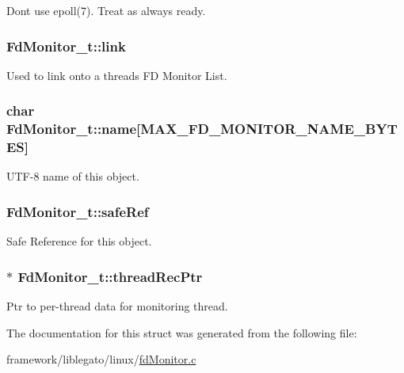 Don\textquotesingle{}t use epoll(7). Treat as always ready. 

\subsubsection[{\texorpdfstring{link}{link}}]{ Fd\+Monitor\+\_\+t\+::link}\hypertarget{struct_fd_monitor__t_aea39e3924b8381f24652d4ed432d5d1e}{}\label{struct_fd_monitor__t_aea39e3924b8381f24652d4ed432d5d1e}


Used to link onto a thread\textquotesingle{}s FD Monitor List. 

\subsubsection[{\texorpdfstring{name}{name}}]{\setlength{\rightskip}{0pt plus 5cm}char Fd\+Monitor\+\_\+t\+::name\mbox{[}{\bf M\+A\+X\+\_\+\+F\+D\+\_\+\+M\+O\+N\+I\+T\+O\+R\+\_\+\+N\+A\+M\+E\+\_\+\+B\+Y\+T\+ES}\mbox{]}}\hypertarget{struct_fd_monitor__t_a625d32b179f538af9be84b15f969f3aa}{}\label{struct_fd_monitor__t_a625d32b179f538af9be84b15f969f3aa}


U\+T\+F-\/8 name of this object. 

\subsubsection[{\texorpdfstring{safe\+Ref}{safeRef}}]{ Fd\+Monitor\+\_\+t\+::safe\+Ref}\hypertarget{struct_fd_monitor__t_aa12df9f2b06d5d406f127a01053edba2}{}\label{struct_fd_monitor__t_aa12df9f2b06d5d406f127a01053edba2}


Safe Reference for this object. 

\subsubsection[{\texorpdfstring{thread\+Rec\+Ptr}{threadRecPtr}}]{$\ast$ Fd\+Monitor\+\_\+t\+::thread\+Rec\+Ptr}\hypertarget{struct_fd_monitor__t_ad894493e157ee5a16026418dcd37d1f5}{}\label{struct_fd_monitor__t_ad894493e157ee5a16026418dcd37d1f5}


Ptr to per-\/thread data for monitoring thread. 



The documentation for this struct was generated from the following file\+:\begin{DoxyCompactItemize}
\item 
framework/liblegato/linux/\hyperlink{fd_monitor_8c}{fd\+Monitor.\+c}\end{DoxyCompactItemize}
